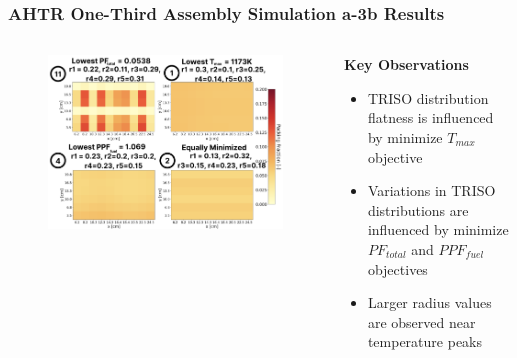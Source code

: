 \begin{frame}
    \frametitle{AHTR One-Third Assembly Simulation a-3b Results}
    \begin{columns}
        \begin{column}{0.6\textwidth}
        \begin{figure}
            \includegraphics[width=\linewidth]{figures/a-3b-four-disr.png} 
        \end{figure}
        \end{column}
        \begin{column}{0.4\textwidth}
            \textbf{Key Observations}
            \begin{itemize}
                \item TRISO distribution flatness is influenced by minimize $T_{max}$
                objective 
                \item Variations in TRISO distributions are influenced by minimize 
                $PF_{total}$ and $PPF_{fuel}$ objectives 
                \item Larger radius values are observed near temperature peaks 
            \end{itemize}
        \end{column}
        \end{columns}
\end{frame}

